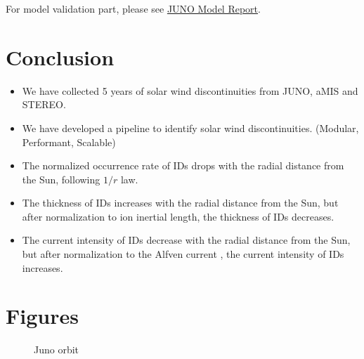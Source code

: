 \documentclass[
]{agujournal2019}
\providecommand{\tightlist}{%
  \setlength{\itemsep}{0pt}\setlength{\parskip}{0pt}}\usepackage{longtable,booktabs,array}
\begin{document}
For model validation part, please see \href{notebooks/20_model.ipynb}{JUNO Model Report}.

\section{Conclusion}\label{conclusion}

\begin{itemize}
\tightlist
\item
  We have collected 5 years of solar wind discontinuities from JUNO, aMIS and STEREO.
\item
  We have developed a pipeline to identify solar wind discontinuities. (Modular, Performant, Scalable)
\item
  The normalized occurrence rate of IDs drops with the radial distance from the Sun, following \(1/r\) law.
\item
  The thickness of IDs increases with the radial distance from the Sun, but after normalization to ion inertial length, the thickness of IDs decreases.
\item
  The current intensity of IDs decrease with the radial distance from the Sun, but after normalization to the Alfven current , the current intensity of IDs increases.
\end{itemize}

\section{Figures}\label{figures}

\begin{figure}


\caption{\label{fig-orbit}Juno orbit}

\end{figure}%
\end{document}
